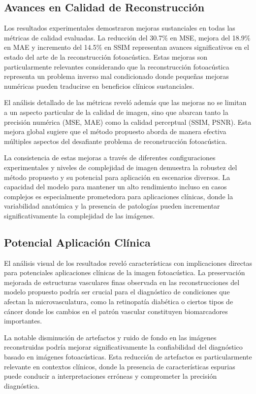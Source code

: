 \subsection{Avances en Calidad de Reconstrucción}

Los resultados experimentales demostraron mejoras sustanciales en todas las métricas de calidad evaluadas. La reducción del 30.7\% en MSE, mejora del 18.9\% en MAE y incremento del 14.5\% en SSIM representan avances significativos en el estado del arte de la reconstrucción fotoacústica. Estas mejoras son particularmente relevantes considerando que la reconstrucción fotoacústica representa un problema inverso mal condicionado donde pequeñas mejoras numéricas pueden traducirse en beneficios clínicos sustanciales.

El análisis detallado de las métricas reveló además que las mejoras no se limitan a un aspecto particular de la calidad de imagen, sino que abarcan tanto la precisión numérica (MSE, MAE) como la calidad perceptual (SSIM, PSNR). Esta mejora global sugiere que el método propuesto aborda de manera efectiva múltiples aspectos del desafiante problema de reconstrucción fotoacústica.

La consistencia de estas mejoras a través de diferentes configuraciones experimentales y niveles de complejidad de imagen demuestra la robustez del método propuesto y su potencial para aplicación en escenarios diversos. La capacidad del modelo para mantener un alto rendimiento incluso en casos complejos es especialmente prometedora para aplicaciones clínicas, donde la variabilidad anatómica y la presencia de patologías pueden incrementar significativamente la complejidad de las imágenes.

\subsection{Potencial Aplicación Clínica}

El análisis visual de los resultados reveló características con implicaciones directas para potenciales aplicaciones clínicas de la imagen fotoacústica. La preservación mejorada de estructuras vasculares finas observada en las reconstrucciones del modelo propuesto podría ser crucial para el diagnóstico de condiciones que afectan la microvasculatura, como la retinopatía diabética o ciertos tipos de cáncer donde los cambios en el patrón vascular constituyen biomarcadores importantes.

La notable disminución de artefactos y ruido de fondo en las imágenes reconstruidas podría mejorar significativamente la confiabilidad del diagnóstico basado en imágenes fotoacústicas. Esta reducción de artefactos es particularmente relevante en contextos clínicos, donde la presencia de características espurias puede conducir a interpretaciones erróneas y comprometer la precisión diagnóstica.

